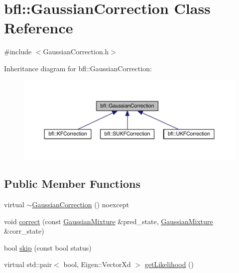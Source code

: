 \hypertarget{classbfl_1_1GaussianCorrection}{}\section{bfl\+:\+:Gaussian\+Correction Class Reference}
\label{classbfl_1_1GaussianCorrection}


{\ttfamily \#include $<$Gaussian\+Correction.\+h$>$}



Inheritance diagram for bfl\+:\+:Gaussian\+Correction\+:
\nopagebreak
\begin{figure}[H]
\begin{center}
\leavevmode
\includegraphics[width=350pt]{classbfl_1_1GaussianCorrection__inherit__graph}
\end{center}
\end{figure}
\subsection*{Public Member Functions}
\begin{DoxyCompactItemize}
\item 
virtual \mbox{\hyperlink{classbfl_1_1GaussianCorrection_a0144ae562cdda69763e8b6af2ed45669}{$\sim$\+Gaussian\+Correction}} () noexcept
\item 
void \mbox{\hyperlink{classbfl_1_1GaussianCorrection_a6308c8af37a1a451eba8e87e73952c84}{correct}} (const \mbox{\hyperlink{classbfl_1_1GaussianMixture}{Gaussian\+Mixture}} \&pred\+\_\+state, \mbox{\hyperlink{classbfl_1_1GaussianMixture}{Gaussian\+Mixture}} \&corr\+\_\+state)
\item 
bool \mbox{\hyperlink{classbfl_1_1GaussianCorrection_a986b05b149650ea4dd725b10700db57f}{skip}} (const bool status)
\item 
virtual std\+::pair$<$ bool, Eigen\+::\+Vector\+Xd $>$ \mbox{\hyperlink{classbfl_1_1GaussianCorrection_a955702adbdad6448d8f306752d3d0868}{get\+Likelihood}} ()
\end{DoxyCompactItemize}

